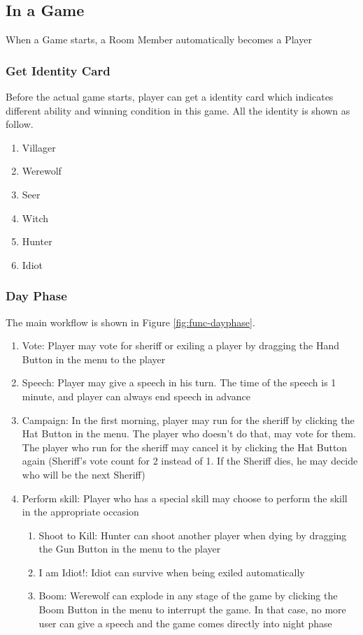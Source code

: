 \documentclass[11pt]{article}
\begin{document}
\subsection{In a Game}
When a Game starts, a Room Member automatically becomes a Player
\subsubsection{Get Identity Card}
Before the actual game starts, player can get a identity card which indicates different ability and winning condition in this game. All the identity is shown as follow.

\begin{enumerate}
\item
Villager
\item
Werewolf
\item
Seer
\item
Witch
\item
Hunter
\item
Idiot
\end{enumerate}

\subsubsection{Day Phase}
The main workflow is shown in Figure \ref{fig:func-dayphase}.

\begin{enumerate}
\item
Vote: Player may vote for sheriff or exiling a player by dragging the Hand Button in the menu to the player

\item
Speech: Player may give a speech in his turn. The time of the speech is 1 minute, and player can always end speech in advance

\item
Campaign: In the first morning, player may run for the sheriff by clicking the Hat Button in the menu. The player who doesn't do that, may vote for them. The player who run for the sheriff may cancel it by clicking the Hat Button again (Sheriff's vote count for 2 instead of 1. If the Sheriff dies, he may decide who will be the next Sheriff)

\item
Perform skill: Player who has a special skill may choose to perform the skill in the appropriate occasion

\begin{enumerate}
\item
Shoot to Kill: Hunter can shoot another player when dying by dragging the Gun Button in the menu to the player
\item
I am Idiot!: Idiot can survive when being exiled automatically
\item
Boom: Werewolf can explode in any stage of the game by clicking the Boom Button in the menu to interrupt the game. In that case, no more user can give a speech and the game comes directly into night phase
\end{enumerate}

\end{enumerate}
\end{document}
